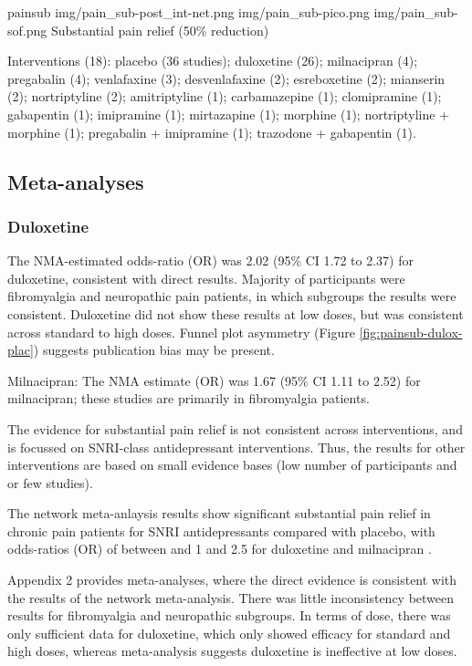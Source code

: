 \documentclass{report}\usepackage[]{graphicx}\usepackage[]{color}
\begin{document}
\soffignew
{painsub}
{img/pain_sub-post_int-net.png}
{img/pain_sub-pico.png}
{img/pain_sub-sof.png}
{Substantial pain relief (50\% reduction)}


Interventions (18): placebo (36 studies); duloxetine (26); milnacipran (4); pregabalin (4); venlafaxine (3); desvenlafaxine (2); esreboxetine (2); mianserin (2); nortriptyline (2); amitriptyline (1); carbamazepine (1); clomipramine (1); gabapentin (1); imipramine (1); mirtazapine (1); morphine (1); nortriptyline + morphine (1); pregabalin + imipramine (1); trazodone + gabapentin (1).

\subsection{Meta-analyses}

\subsubsection{Duloxetine}

The NMA-estimated odds-ratio (OR) was 2.02 (95\% CI 1.72 to 2.37) for duloxetine, consistent with direct results. Majority of participants were fibromyalgia and neuropathic pain patients, in which subgroups the results were consistent. Duloxetine did not show these results at low doses, but was consistent across standard to high doses. Funnel plot asymmetry (Figure \ref{fig:painsub-dulox-plac}) suggests publication bias may be present.


Milnacipran: The NMA estimate (OR) was 1.67 (95\% CI 1.11 to 2.52) for milnacipran; these studies are primarily in fibromyalgia patients.

 The evidence for substantial pain relief is not consistent across interventions, and is focussed on SNRI-class antidepressant interventions. Thus, the results for other interventions are based on small evidence bases (low number of participants and or few studies).

The network meta-anlaysis results show significant substantial pain relief in chronic pain patients for SNRI antidepressants compared with placebo, with odds-ratios (OR) of between and 1 and 2.5 for duloxetine and milnacipran .

Appendix 2 provides meta-analyses, where the direct evidence is consistent with the results of the network meta-analysis. There was little inconsistency between results for fibromyalgia and neuropathic subgroups.  In terms of dose, there was only sufficient data for duloxetine, which only showed efficacy for standard and high doses,  whereas meta-analysis suggests duloxetine is ineffective at low doses.
\end{document}
